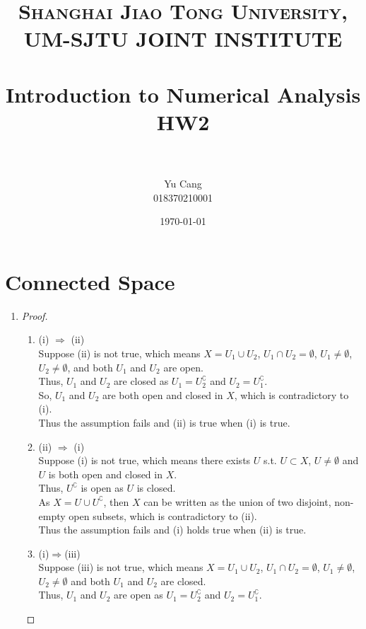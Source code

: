 \documentclass[paper=a4, fontsize=11pt]{scrartcl} %
\title{	
\normalfont \normalsize 
\textsc{Shanghai Jiao Tong University, UM-SJTU JOINT INSTITUTE} \\ [25pt] %
\horrule{0.5pt} \\[0.4cm] %
\huge Introduction to Numerical Analysis \\ HW2 \\ %
\horrule{2pt} \\[0.5cm] %
}
\author{Yu Cang \\ 018370210001} %
\date{\normalsize \today} %
\numberwithin{equation}{section} %
\numberwithin{figure}{section} %
\numberwithin{table}{section} %
\begin{document}
\maketitle %


\section{Connected Space}
\begin{enumerate}
	\item
		\begin{proof}
			\begin{enumerate}
				\item (i) $\Rightarrow$ (ii) \\
					Suppose (ii) is not true, which means $X = U_1 \cup U_2$, $U_1 \cap U_2 = \emptyset$, $U_1 \neq \emptyset$, $U_2 \neq \emptyset$, and both $U_1$ and $U_2$ are open.\\
					Thus, $U_1$ and $U_2$ are closed as $U_1 = U_2^\complement$ and $U_2 = U_1^\complement$.\\
					So, $U_1$ and $U_2$ are both open and closed in $X$, which is contradictory to (i).\\
					Thus the assumption fails and (ii) is true when (i) is true.
				\item (ii) $\Rightarrow$ (i)\\
					Suppose (i) is not true, which means there exists $U$ s.t. $U \subset X$, $U \neq \emptyset$ and $U$ is both open and closed in $X$.\\
					Thus, $U^\complement$ is open as $U$ is closed.\\
					As $X = U \cup U^\complement$, then $X$ can be written as the union of two disjoint, non-empty open subsets, which is contradictory to (ii).\\
					Thus the assumption fails and (i) holds true when (ii) is true. 
				\item (i)$\Rightarrow$(iii)\\
					Suppose (iii) is not true, which means $X = U_1 \cup U_2$, $U_1 \cap U_2 = \emptyset$, $U_1 \neq \emptyset$, $U_2 \neq \emptyset$ and both $U_1$ and $U_2$ are closed.\\
					Thus, $U_1$ and $U_2$ are open as $U_1 = U_2^\complement$ and $U_2 = U_1^\complement$.\\

\end{enumerate}
\end{proof}
\end{enumerate}
\end{document}

